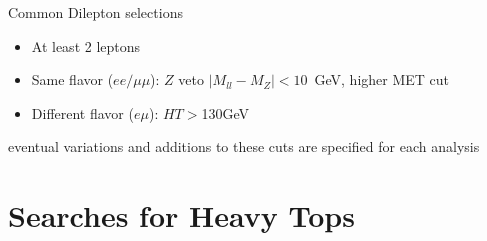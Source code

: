 \documentclass[xcolor=dvipsnames,10pt]{beamer}
\begin{document}
\begin{frame}
\begin{minipage}{.5\textwidth}
\begin{minipage}{.9\textwidth}
\end{minipage}

\vspace{\baselineskip}

\begin{minipage}{.9\textwidth}
\centering

\alert{Common Dilepton selections}

\begin{itemize}\scriptsize
\item At least 2 leptons
\item Same flavor ($ee/\mu\mu$): $Z$ veto $|M_{ll} - M_Z| < 10$~GeV, higher MET cut
\item Different flavor ($e\mu$): $HT>$130GeV
\end{itemize}

\end{minipage}
\end{minipage}

eventual variations and additions to these cuts are specified for each analysis

\end{frame}


\section{Searches for Heavy Tops}
\end{document}
